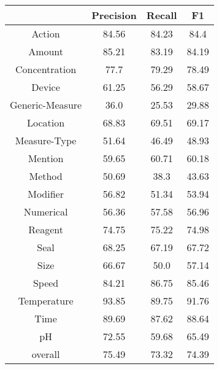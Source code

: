 \begin{table}[htbp]
\centering
\begin{tabular}{|c|c|c|c|}
\hline
 & Precision & Recall & F1\\
\hline
Action & 84.56 & 84.23 & 84.4\\
\hline
Amount & 85.21 & 83.19 & 84.19\\
\hline
Concentration & 77.7 & 79.29 & 78.49\\
\hline
Device & 61.25 & 56.29 & 58.67\\
\hline
Generic-Measure & 36.0 & 25.53 & 29.88\\
\hline
Location & 68.83 & 69.51 & 69.17\\
\hline
Measure-Type & 51.64 & 46.49 & 48.93\\
\hline
Mention & 59.65 & 60.71 & 60.18\\
\hline
Method & 50.69 & 38.3 & 43.63\\
\hline
Modifier & 56.82 & 51.34 & 53.94\\
\hline
Numerical & 56.36 & 57.58 & 56.96\\
\hline
Reagent & 74.75 & 75.22 & 74.98\\
\hline
Seal & 68.25 & 67.19 & 67.72\\
\hline
Size & 66.67 & 50.0 & 57.14\\
\hline
Speed & 84.21 & 86.75 & 85.46\\
\hline
Temperature & 93.85 & 89.75 & 91.76\\
\hline
Time & 89.69 & 87.62 & 88.64\\
\hline
pH & 72.55 & 59.68 & 65.49\\
\hline
overall & 75.49 & 73.32 & 74.39\\
\hline
\end{tabular}
\caption{}
\end{table}




